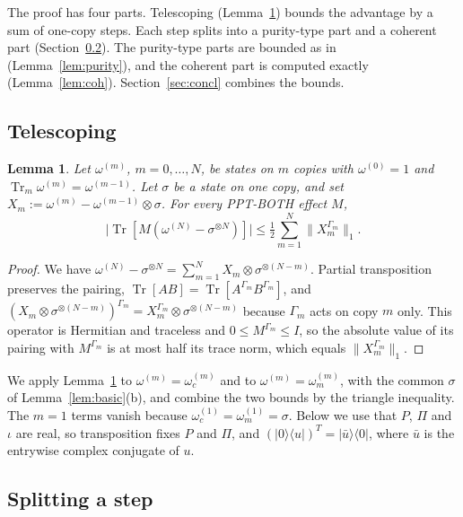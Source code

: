 \documentclass[pdflatex,sn-mathphys-num]{sn-jnl}%
\theoremstyle{thmstyleone}
\newtheorem{lemma}[theorem]{Lemma}
\theoremstyle{thmstylethree}
\theoremstyle{thmstyletwo}
\newcommand{\Tr}{\operatorname{Tr}}
\newcommand{\ket}[1]{|#1\rangle}
\newcommand{\bra}[1]{\langle #1|}
\begin{document}
The proof has four parts. Telescoping (Lemma~\ref{lem:tele}) bounds the advantage by a sum of one-copy steps. Each step
splits into a purity-type part and a coherent part (Section~\ref{sec:split}). The purity-type parts are bounded as
in~\cite{ab} (Lemma~\ref{lem:purity}), and the coherent part is computed exactly (Lemma~\ref{lem:coh}).
Section~\ref{sec:concl} combines the bounds.

\subsection{\texorpdfstring{Telescoping~\cite{ab}}{Telescoping}}

\begin{lemma}\label{lem:tele}
Let $\omega^{(m)}$, $m=0,\dots,N$, be states on $m$ copies with $\omega^{(0)}=1$ and $\Tr_m\omega^{(m)}=\omega^{(m-1)}$.
Let $\sigma$ be a state on one copy, and set $X_m:=\omega^{(m)}-\omega^{(m-1)}\otimes\sigma$. For every PPT-BOTH effect
$M$,
\[
\bigl|\Tr[M(\omega^{(N)}-\sigma^{\otimes N})]\bigr|\le\tfrac12\sum_{m=1}^N\|X_m^{\Gamma_m}\|_1 .
\]
\end{lemma}
\begin{proof}
We have $\omega^{(N)}-\sigma^{\otimes N}=\sum_{m=1}^NX_m\otimes\sigma^{\otimes(N-m)}$. Partial transposition preserves
the pairing, $\Tr[AB]=\Tr[A^{\Gamma_m}B^{\Gamma_m}]$, and $(X_m\otimes\sigma^{\otimes(N-m)})^{\Gamma_m}=
X_m^{\Gamma_m}\otimes\sigma^{\otimes(N-m)}$ because $\Gamma_m$ acts on copy $m$ only. This operator is Hermitian and
traceless and $0\le M^{\Gamma_m}\le I$, so the absolute value of its pairing with $M^{\Gamma_m}$ is at most half its trace
norm, which equals $\|X_m^{\Gamma_m}\|_1$.
\end{proof}

We apply Lemma~\ref{lem:tele} to $\omega^{(m)}=\omega_c^{(m)}$ and to $\omega^{(m)}=\omega_m^{(m)}$, with the common
$\sigma$ of Lemma~\ref{lem:basic}(b), and combine the two bounds by the triangle inequality. The $m=1$ terms vanish
because $\omega_c^{(1)}=\omega_m^{(1)}=\sigma$. Below we use that $P$, $\Pi$ and $\iota$ are real, so transposition fixes
$P$ and $\Pi$, and $(\ket0\bra u)^T=\ket{\bar u}\bra0$, where $\bar u$ is the entrywise complex conjugate of $u$.

\subsection{Splitting a step}\label{sec:split}
\end{document}
